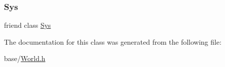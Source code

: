 \subsubsection{\texorpdfstring{Sys}{Sys}}
{\footnotesize\ttfamily friend class \mbox{\hyperlink{classSys}{Sys}}\hspace{0.3cm}{\ttfamily [friend]}}



The documentation for this class was generated from the following file\+:\begin{DoxyCompactItemize}
\item 
base/\mbox{\hyperlink{World_8h}{World.\+h}}\end{DoxyCompactItemize}
